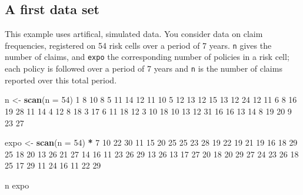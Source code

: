 \documentclass[
]{book}
\newenvironment{Shaded}{\begin{snugshade}}{\end{snugshade}}
\newcommand{\DataTypeTok}[1]{\textcolor[rgb]{0.13,0.29,0.53}{#1}}
\newcommand{\DecValTok}[1]{\textcolor[rgb]{0.00,0.00,0.81}{#1}}
\newcommand{\KeywordTok}[1]{\textcolor[rgb]{0.13,0.29,0.53}{\textbf{#1}}}
\newcommand{\NormalTok}[1]{#1}
\newcommand{\OperatorTok}[1]{\textcolor[rgb]{0.81,0.36,0.00}{\textbf{#1}}}
\newcommand{\StringTok}[1]{\textcolor[rgb]{0.31,0.60,0.02}{#1}}
\begin{document}
\hypertarget{a-first-data-set}{%
\subsection{A first data set}\label{a-first-data-set}}

This example uses artifical, simulated data. You consider data on claim frequencies, registered on 54 risk cells over a period of 7 years. \texttt{n} gives the number of claims, and \texttt{expo} the corresponding number of policies in a risk cell; each policy is followed over a period of 7 years and \texttt{n} is the number of claims reported over this total period.

\begin{Shaded}
\begin{Highlighting}[]
\NormalTok{n <-}\StringTok{ }\KeywordTok{scan}\NormalTok{(}\DataTypeTok{n =} \DecValTok{54}\NormalTok{)}
\DecValTok{1}  \DecValTok{8} \DecValTok{10}  \DecValTok{8}  \DecValTok{5} \DecValTok{11} \DecValTok{14} \DecValTok{12} \DecValTok{11} \DecValTok{10}  \DecValTok{5} \DecValTok{12} \DecValTok{13} \DecValTok{12} \DecValTok{15} \DecValTok{13} \DecValTok{12} \DecValTok{24}
\DecValTok{12} \DecValTok{11}  \DecValTok{6}  \DecValTok{8} \DecValTok{16} \DecValTok{19} \DecValTok{28} \DecValTok{11} \DecValTok{14}  \DecValTok{4} \DecValTok{12}  \DecValTok{8} \DecValTok{18}  \DecValTok{3} \DecValTok{17}  \DecValTok{6} \DecValTok{11} \DecValTok{18}
\DecValTok{12}  \DecValTok{3} \DecValTok{10} \DecValTok{18} \DecValTok{10} \DecValTok{13} \DecValTok{12} \DecValTok{31} \DecValTok{16} \DecValTok{16} \DecValTok{13} \DecValTok{14}  \DecValTok{8} \DecValTok{19} \DecValTok{20}  \DecValTok{9} \DecValTok{23} \DecValTok{27}

\NormalTok{expo <-}\StringTok{ }\KeywordTok{scan}\NormalTok{(}\DataTypeTok{n =} \DecValTok{54}\NormalTok{) }\OperatorTok{*}\StringTok{ }\DecValTok{7}
\DecValTok{10} \DecValTok{22} \DecValTok{30} \DecValTok{11} \DecValTok{15} \DecValTok{20} \DecValTok{25} \DecValTok{25} \DecValTok{23} \DecValTok{28} \DecValTok{19} \DecValTok{22} \DecValTok{19} \DecValTok{21} \DecValTok{19} \DecValTok{16} \DecValTok{18} \DecValTok{29}
\DecValTok{25} \DecValTok{18} \DecValTok{20} \DecValTok{13} \DecValTok{26} \DecValTok{21} \DecValTok{27} \DecValTok{14} \DecValTok{16} \DecValTok{11} \DecValTok{23} \DecValTok{26} \DecValTok{29} \DecValTok{13} \DecValTok{26} \DecValTok{13} \DecValTok{17} \DecValTok{27}
\DecValTok{20} \DecValTok{18} \DecValTok{20} \DecValTok{29} \DecValTok{27} \DecValTok{24} \DecValTok{23} \DecValTok{26} \DecValTok{18} \DecValTok{25} \DecValTok{17} \DecValTok{29} \DecValTok{11} \DecValTok{24} \DecValTok{16} \DecValTok{11} \DecValTok{22} \DecValTok{29}

\NormalTok{n}
\NormalTok{expo}
\end{Highlighting}
\end{Shaded}
\end{document}
